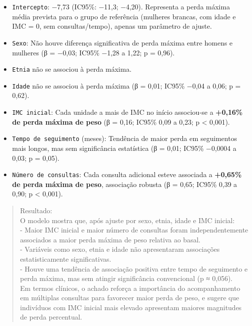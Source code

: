 \documentclass[
]{article}
\providecommand{\tightlist}{%
  \setlength{\itemsep}{0pt}\setlength{\parskip}{0pt}}\usepackage{longtable,booktabs,array}
\begin{document}
\begin{itemize}
\tightlist
\item
  \texttt{Intercepto}: −7,73 (IC95\%: −11,3; −4,20). Representa a perda
  máxima média prevista para o grupo de referência (mulheres brancas,
  com idade e IMC = 0, sem consultas/tempo), apenas um parâmetro de
  ajuste.\\
\item
  \texttt{Sexo}: Não houve diferença significativa de perda máxima entre
  homens e mulheres (β = −0,03; IC95\% −1,28 a 1,22; p = 0,96).\\
\item
  \texttt{Etnia} não se associou à perda máxima.\\
\item
  \texttt{Idade} não se associou à perda máxima (β = 0,01; IC95\% −0,04
  a 0,06; p = 0,62).\\
\item
  \texttt{IMC\ inicial}: Cada unidade a mais de IMC no início
  associou-se a \textbf{+0,16\% de perda máxima de peso} (β = 0,16;
  IC95\% 0,09 a 0,23; p \textless{} 0,001).\\
\item
  \texttt{Tempo\ de\ seguimento} (meses): Tendência de maior perda em
  seguimentos mais longos, mas sem significância estatística (β = 0,01;
  IC95\% −0,0004 a 0,03; p = 0,05).\\
\item
  \texttt{Número\ de\ consultas}: Cada consulta adicional esteve
  associada a \textbf{+0,65\% de perda máxima de peso}, associação
  robusta (β = 0,65; IC95\% 0,39 a 0,90; p \textless{} 0,001).\\
\end{itemize}

\begin{quote}
Resultado:\\
O modelo mostra que, após ajuste por sexo, etnia, idade e IMC inicial:\\
- Maior IMC inicial e maior número de consultas foram independentemente
associados a maior perda máxima de peso relativa ao basal.\\
- Variáveis como sexo, etnia e idade não apresentaram associações
estatisticamente significativas.\\
- Houve uma tendência de associação positiva entre tempo de seguimento e
perda máxima, mas sem atingir significância convencional (p ≈ 0,056).\\
Em termos clínicos, o achado reforça a importância do acompanhamento em
múltiplas consultas para favorecer maior perda de peso, e sugere que
indivíduos com IMC inicial mais elevado apresentam maiores magnitudes de
perda percentual.\\
\end{quote}
\end{document}
